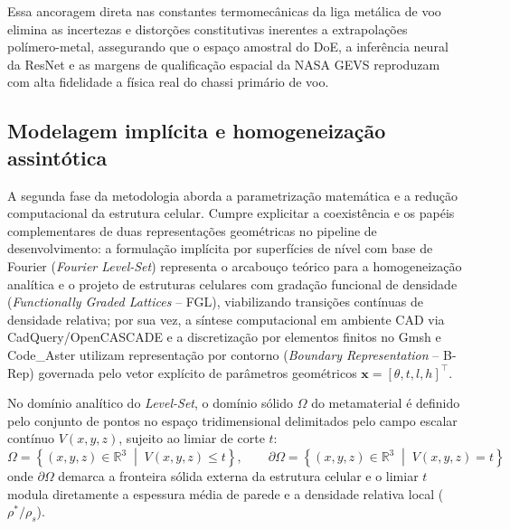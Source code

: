 Essa ancoragem direta nas constantes termomecânicas da liga metálica de voo elimina as incertezas e distorções constitutivas inerentes a extrapolações polímero-metal, assegurando que o espaço amostral do DoE, a inferência neural da ResNet e as margens de qualificação espacial da NASA GEVS reproduzam com alta fidelidade a física real do chassi primário de voo.

\subsection{Modelagem implícita e homogeneização assintótica}
\label{subsec:implicita}

A segunda fase da metodologia aborda a parametrização matemática e a redução computacional da estrutura celular. Cumpre explicitar a coexistência e os papéis complementares de duas representações geométricas no pipeline de desenvolvimento: a formulação implícita por superfícies de nível com base de Fourier (\textit{Fourier Level-Set}) representa o arcabouço teórico para a homogeneização analítica e o projeto de estruturas celulares com gradação funcional de densidade (\textit{Functionally Graded Lattices} -- FGL), viabilizando transições contínuas de densidade relativa; por sua vez, a síntese computacional em ambiente CAD via CadQuery/OpenCASCADE e a discretização por elementos finitos no Gmsh e Code\_Aster utilizam representação por contorno (\textit{Boundary Representation} -- B-Rep) governada pelo vetor explícito de parâmetros geométricos $\mathbf{x} = [\theta, t, l, h]^\top$.

No domínio analítico do \textit{Level-Set}, o domínio sólido $\Omega$ do metamaterial é definido pelo conjunto de pontos no espaço tridimensional delimitados pelo campo escalar contínuo $V(x,y,z)$, sujeito ao limiar de corte $t$:
\begin{equation}
  \Omega = \left\{ (x,y,z) \in \mathbb{R}^3 \;\middle|\; V(x,y,z) \le t \right\}, \qquad \partial\Omega = \left\{ (x,y,z) \in \mathbb{R}^3 \;\middle|\; V(x,y,z) = t \right\}
  \label{eq:iso}
\end{equation}
onde $\partial\Omega$ demarca a fronteira sólida externa da estrutura celular e o limiar $t$ modula diretamente a espessura média de parede e a densidade relativa local ($\rho^{*}/\rho_s$).


